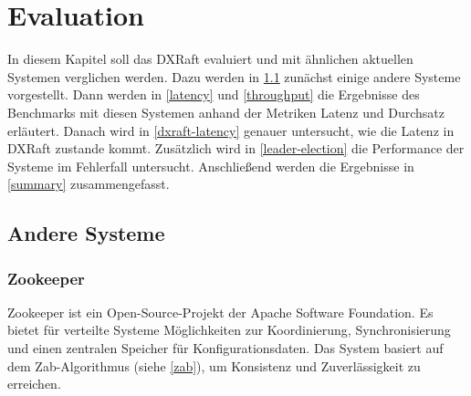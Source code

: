 \chapter{Evaluation}
\label{eval}

In diesem Kapitel soll das DXRaft evaluiert und mit ähnlichen aktuellen Systemen verglichen werden. Dazu werden in \ref{systems} zunächst einige andere Systeme vorgestellt. Dann werden in \ref{latency} und \ref{throughput} die Ergebnisse des Benchmarks mit diesen Systemen anhand der Metriken Latenz und Durchsatz erläutert. Danach wird in \ref{dxraft-latency} genauer untersucht, wie die Latenz in DXRaft zustande kommt. Zusätzlich wird in \ref{leader-election} die Performance der Systeme im Fehlerfall untersucht. Anschließend werden die Ergebnisse in \ref{summary} zusammengefasst.

\section{Andere Systeme}
\label{systems}

\subsection{Zookeeper}

Zookeeper \cite{zookeeper} ist ein Open-Source-Projekt der Apache Software Foundation. Es bietet für verteilte Systeme Möglichkeiten zur Koordinierung, Synchronisierung und einen zentralen Speicher für Konfigurationsdaten. Das System basiert auf dem Zab-Algorithmus (siehe \ref{zab}), um Konsistenz und Zuverlässigkeit zu erreichen.

